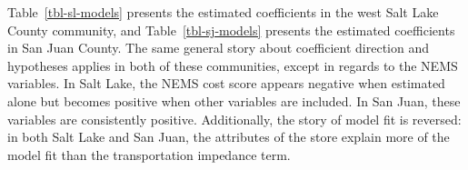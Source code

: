 \documentclass[
  letterpaper,
  number,
  review,
  3p]{elsarticle}
\begin{document}
\begin{table}

\caption{\label{tbl-sj-models}Estimated Models of San Juan County}


\end{table}%

Table~\ref{tbl-sl-models} presents the estimated coefficients in the
west Salt Lake County community, and Table~\ref{tbl-sj-models} presents
the estimated coefficients in San Juan County. The same general story
about coefficient direction and hypotheses applies in both of these
communities, except in regards to the NEMS variables. In Salt Lake, the
NEMS cost score appears negative when estimated alone but becomes
positive when other variables are included. In San Juan, these variables
are consistently positive. Additionally, the story of model fit is
reversed: in both Salt Lake and San Juan, the attributes of the store
explain more of the model fit than the transportation impedance term.
\end{document}
